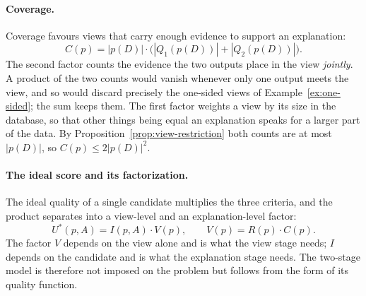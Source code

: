\paragraph{Coverage.}
Coverage favours views that carry enough evidence to support an explanation:
\begin{equation}
C(p)=|p(D)|\cdot\big(|Q_1(p(D))|+|Q_2(p(D))|\big).
\label{eq:ideal-coverage}
\end{equation}
The second factor counts the evidence the two outputs place in the view \emph{jointly}.
A product of the two counts would vanish whenever only one output meets the view, and so would discard precisely the one-sided views of Example~\ref{ex:one-sided}; the sum keeps them.
The first factor weights a view by its size in the database, so that other things being equal an explanation speaks for a larger part of the data.
By Proposition~\ref{prop:view-restriction} both counts are at most $|p(D)|$, so $C(p)\le2|p(D)|^2$.

\paragraph{The ideal score and its factorization.}
The ideal quality of a single candidate multiplies the three criteria, and the product separates into a view-level and an explanation-level factor:
\begin{equation}
U^*(p,A)=I(p,A)\cdot V(p),\qquad V(p)=R(p)\cdot C(p).
\label{eq:ideal-factorization}
\end{equation}
The factor $V$ depends on the view alone and is what the view stage needs; $I$ depends on the candidate and is what the explanation stage needs.
The two-stage model is therefore not imposed on the problem but follows from the form of its quality function.

